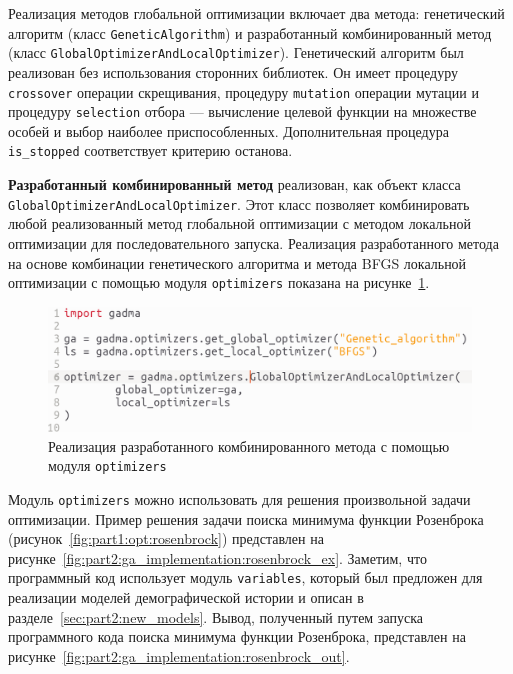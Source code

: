 Реализация методов глобальной оптимизации включает два метода: генетический алгоритм (класс \texttt{GeneticAlgorithm}) и разработанный комбинированный метод (класс \texttt{GlobalOptimizerAndLocalOptimizer}).
Генетический алгоритм был реализован без использования сторонних библиотек.
Он имеет процедуру \texttt{crossover} операции скрещивания, процедуру \texttt{mutation} операции мутации и процедуру \texttt{selection} отбора --- вычисление целевой функции на множестве особей и выбор наиболее приспособленных.
Дополнительная процедура \texttt{is\_stopped} соответствует критерию останова.

\textbf{Разработанный комбинированный метод} реализован, как объект класса \texttt{GlobalOptimizerAndLocalOptimizer}.
Этот класс позволяет комбинировать любой реализованный метод глобальной оптимизации с методом локальной оптимизации для последовательного запуска.
Реализация разработанного метода на основе комбинации генетического алгоритма и метода BFGS локальной оптимизации с помощью модуля \texttt{optimizers} показана на рисунке~\ref{fig:part2:optimizer_implementation}.

\begin{figure}[ht]
    \centering
    \includegraphics[width=\linewidth]{images/part2/genetics_algorithm/optimizer_implementation.png}
    \caption{Реализация разработанного комбинированного метода с помощью модуля \texttt{optimizers}}
    \label{fig:part2:optimizer_implementation}
\end{figure}

Модуль \texttt{optimizers} можно использовать для решения произвольной задачи оптимизации.
Пример решения задачи поиска минимума функции Розенброка~\cite{rosenbrock1960automatic} (рисунок~\ref{fig:part1:opt:rosenbrock}) представлен на рисунке~\ref{fig:part2:ga_implementation:rosenbrock_ex}.
Заметим, что программный код использует модуль \texttt{variables}, который был предложен для реализации моделей демографической истории и описан в разделе~\ref{sec:part2:new_models}.
Вывод, полученный путем запуска программного кода поиска минимума функции Розенброка, представлен на рисунке~\ref{fig:part2:ga_implementation:rosenbrock_out}.

